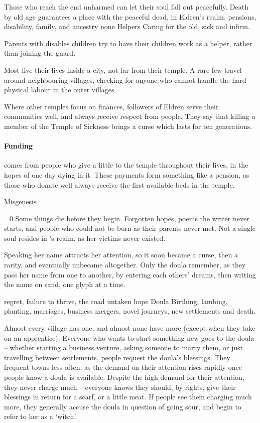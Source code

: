 \begin{multicols}{2}
{    Those who reach the end unharmed can let their soul fall out peacefully.
    Death by old age guarantees a place with the peaceful dead, in Eldren's realm.
  }%
  {pensions, disability, family, and ancestry}%
  {none}%
  {Helpers}%
  {
    Caring for the old, sick and infirm.
  }%

Parents with disables children try to have their children work as a helper, rather than joining the \gls{guard}.

Most live their lives inside a city, not far from their temple.
A rare few travel around neighbouring villages, checking for anyone who cannot handle the hard physical labour in the outer villages.

Where other temples focus on finances, followers of Eldren serve their communities well, and always receive respect from people.
They say that killing a member of the Temple of Sickness brings a curse which lasts for ten generations.

\paragraph{Funding}
comes from people who give a little to the temple throughout their lives, in the hopes of one day dying in it.
These payments form something like a pension, as those who donate well always receive the first available beds in the temple.

\guild{\hphantom{Nulla}}%
  {\decosix}%
  {Misgenesis}%
  {
  \ifnum\value{temperature}=0\fi
  Some things die before they begin.
  Forgotten hopes, poems the writer never starts, and people who could not be born as their parents never met.
  Not a single soul resides in \hphantom{Nulla}'s realm, as her victims never existed.

  Speaking her name attracts her attention, so it soon became a curse, then a rarity, and eventually unbecame altogether.
  Only the doula remember, as they pass her name from one to another, by entering each others' dreams, then writing the name on sand, one glyph at a time.
  }%
  {regret, failure to thrive, the road untaken}%
  {hope}%
  {Doula}%
  {
    Birthing, lambing, planting, marriages, business mergers, novel journeys, new settlements and death.
  }%

Almost every village has one, and almost none have more (except when they take on an apprentice).
Everyone who wants to start something new goes to the doula -- whether starting a business venture, asking someone to marry them, or just travelling between settlements, people request the doula's blessings.
They frequent towns less often, as the demand on their attention rises rapidly once people know a doula is available.
Despite the high demand for their attention, they never charge much -- everyone knows they should, by rights, give their blessings in return for a scarf, or a little meat.
If people see them charging much more, they generally accuse the doula in question of going sour, and begin to refer to her as a `witch'.


\end{multicols}
